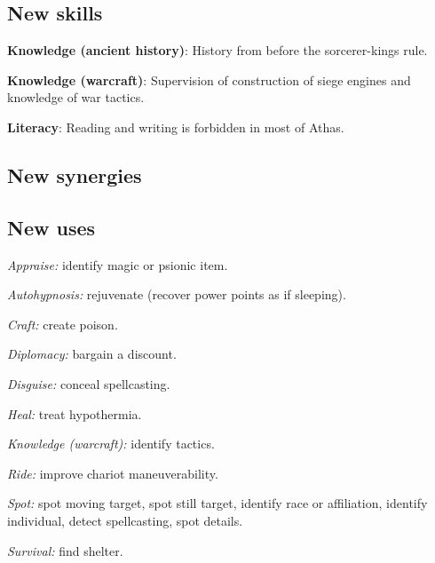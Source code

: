 \subsection{New skills}
\begin{itemize*}
\item \textbf{Knowledge (ancient history)}: History from before the sorcerer-kings rule.
\item \textbf{Knowledge (warcraft)}: Supervision of construction of siege engines and knowledge of war tactics.
\item \textbf{Literacy}: Reading and writing is forbidden in most of Athas.
\end{itemize*}

\subsection{New synergies}

\subsection{New uses}
\begin{itemize*}
\item \textit{Appraise:} identify magic or psionic item.
\item \textit{Autohypnosis:} rejuvenate (recover power points as if sleeping).
\item \textit{Craft:} create poison.
\item \textit{Diplomacy:} bargain a discount.
\item \textit{Disguise:} conceal spellcasting.
\item \textit{Heal:} treat hypothermia.
\item \textit{Knowledge (warcraft):} identify tactics.
\item \textit{Ride:} improve chariot maneuverability.
\item \textit{Spot:} spot moving target, spot still target, identify race or affiliation, identify individual, detect spellcasting, spot details.
\item \textit{Survival:} find shelter.
\end{itemize*}

